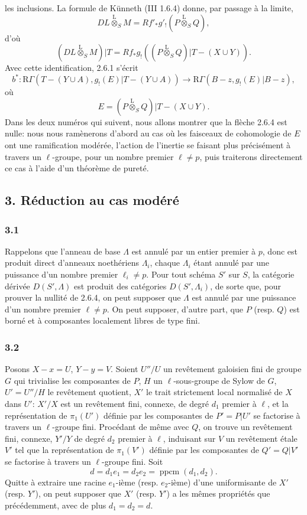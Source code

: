 \documentclass[11pt]{article}
\providecommand{\lten}{\overset{\mathrm L}{\otimes}}
\providecommand{\lten}{\overset{\mathrm L}{\otimes}}
\providecommand{\lten}{\overset{\mathrm L}{\otimes}}
\providecommand{\lten}{\overset{\mathrm L}{\otimes}}
\providecommand{\lten}{\overset{\mathrm L}{\otimes}}
\providecommand{\lten}{\overset{\mathrm L}{\otimes}}
\providecommand{\lten}{\overset{\mathrm L}{\otimes}}
\begin{document}
les inclusions. La formule de Künneth (III 1.6.4) donne, par passage à la limite,
\[
DL\lten_SM=Rf'_*g'_!(P\lten_SQ),
\]
d'où
\begin{equation}
(DL\lten_SM)|T=Rf_*g_!((P\lten_SQ)|T-(X\cup Y)).
\tag{2.6.3}
\end{equation}
Avec cette identification, 2.6.1 s'écrit
\begin{equation}
b^*:\mathrm R\Gamma(T-(Y\cup A),g_!(E)|T-(Y\cup A))
 \longrightarrow \mathrm R\Gamma(B-z,g_!(E)|B-z),
\tag{2.6.4}
\end{equation}
où
\[
E=(P\lten_SQ)|T-(X\cup Y).
\]
Dans les deux numéros qui suivent, nous allons montrer que la flèche 2.6.4 est nulle: nous nous ramènerons d'abord au cas où les faisceaux de cohomologie de $E$ ont une ramification modérée, l'action de l'inertie se faisant plus précisément à travers un $\ell$-groupe, pour un nombre premier $\ell\ne p$, puis traiterons directement ce cas à l'aide d'un théorème de pureté.

\subsection*{3. Réduction au cas modéré}

\subsubsection*{3.1}
Rappelons que l'anneau de base $\Lambda$ est annulé par un entier premier à $p$, donc est produit direct d'anneaux noethériens $\Lambda_i$, chaque $\Lambda_i$ étant annulé par une puissance d'un nombre premier $\ell_i\ne p$. Pour tout schéma $S'$ sur $S$, la catégorie dérivée $D(S',\Lambda)$ est produit des catégories $D(S',\Lambda_i)$, de sorte que, pour prouver la nullité de 2.6.4, on peut supposer que $\Lambda$ est annulé par une puissance d'un nombre premier $\ell\ne p$. On peut supposer, d'autre part, que $P$ (resp. $Q$) est borné et à composantes localement libres de type fini.

\subsubsection*{3.2}
Posons $X-x=U$, $Y-y=V$. Soient $U''/U$ un revêtement galoisien fini de groupe $G$ qui trivialise les composantes de $P$, $H$ un $\ell$-sous-groupe de Sylow de $G$, $U'=U''/H$ le revêtement quotient, $X'$ le trait strictement local normalisé de $X$ dans $U'$: $X'/X$ est un revêtement fini, connexe, de degré $d_1$ premier à $\ell$, et la représentation de $\pi_1(U')$ définie par les composantes de $P'=P|U'$ se factorise à travers un $\ell$-groupe fini. Procédant de même avec $Q$, on trouve un revêtement fini, connexe, $Y'/Y$ de degré $d_2$ premier à $\ell$, induisant sur $V$ un revêtement étale $V'$ tel que la représentation de $\pi_1(V')$ définie par les composantes de $Q'=Q|V'$ se factorise à travers un $\ell$-groupe fini. Soit
\[
d=d_1e_1=d_2e_2=\operatorname{ppcm}(d_1,d_2).
\]
Quitte à extraire une racine $e_1$-ième (resp. $e_2$-ième) d'une uniformisante de $X'$ (resp. $Y'$), on peut supposer que $X'$ (resp. $Y'$) a les mêmes propriétés que précédemment, avec de plus $d_1=d_2=d$.
\end{document}
